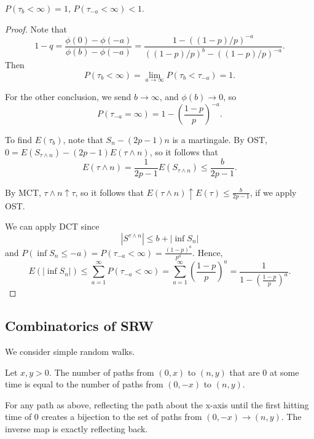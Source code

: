 \documentclass[11pt]{scrartcl}
\begin{document}
\begin{proposition} $P(\tau_b < \infty) = 1$, $P(\tau_{-a} < \infty) < 1$.
\end{proposition}
\begin{proof}
Note that 
$$1-q = \frac{\phi(0) - \phi(-a)}{\phi(b) - \phi(-a)} = \frac{1 - ((1-p)/p)^{-a}}{((1-p)/p)^b - ((1-p)/p)^{-a}}.$$
Then $$P(\tau_b < \infty) = \lim_{a \to \infty} P(\tau_b < \tau_{-a}) = 1.$$

For the other conclusion, we send $b \to \infty$, and $\phi(b) \to 0$, so
$$P(\tau_{-a} = \infty) = 1 - \left (\frac{1-p}{p}\right)^{-a}.$$

To find $E(\tau_b)$, note that $S_n - (2p-1)n$ is a martingale.  By OST, $0 = E(S_{\tau \wedge n}) - (2p-1) E(\tau \wedge n)$, so it follows that 
$$E(\tau \wedge n) = \frac{1}{2p-1}E(S_{\tau \wedge n}) \le \frac{b}{2p-1}.$$  

By MCT, $\tau \wedge n \uparrow \tau$, so it follows that $E(\tau \wedge n) \uparrow E(\tau)\le \frac{b}{2p-1}$, if we apply OST.  

We can apply DCT since 
$$|S^{\tau \wedge n} | \le b + |\inf S_n|$$
and $P(\inf S_n \le -a) = P(\tau_{-a} < \infty) = \frac{(1-p)^a}{p^a}.$
Hence,
$$E(|\inf S_n|) \le \sum_{a=1}^{\infty} P(\tau_{-a} < \infty) = \sum_{a=1}^{\infty} \left (\frac{1-p}{p}\right)^a  = \frac{1}{1 - \left (\frac{1-p}{p}\right )^a}.$$
\end{proof}
\subsection{Combinatorics of SRW}
We consider simple random walks.  

\begin{thm} Let $x, y > 0$.  The number of paths from $(0, x)$ to $(n, y)$ that are $0$ at some time is equal to the number of paths from $(0, -x)$ to $(n, y)$.
\end{thm}
For any path as above, reflecting the path about the x-axis until the first hitting time of $0$ creates a bijection to the set of paths from $(0, -x) \to (n, y)$.  The inverse map is exactly reflecting back.
\end{document}
